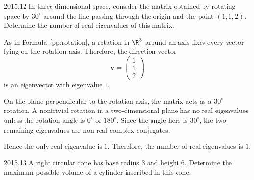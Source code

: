     \begin{pastproblem}{2015.12}
        In three-dimensional space, consider the matrix obtained by rotating space by $30^\circ$
        around the line passing through the origin and the point $(1,1,2)$. Determine the number of
        real eigenvalues of this matrix.
    \end{pastproblem}

    \begin{solution}
        As in Formula~\ref{pp:rotation}, a rotation in
        $\R^3$ around an axis fixes every vector lying on the rotation axis.
        Therefore, the direction vector
        \[
            \mathbf{v}
            =
            \begin{pmatrix}
                1 \\
                1 \\
                2
            \end{pmatrix}
        \]
        is an eigenvector with eigenvalue $1$.

        On the plane perpendicular to the rotation axis, the matrix acts as a $30^\circ$ rotation. A
        nontrivial rotation in a two-dimensional plane has no real eigenvalues unless the rotation
        angle is $0^\circ$ or $180^\circ$. Since the angle here is $30^\circ$, the two remaining
        eigenvalues are non-real complex conjugates.

        Hence the only real eigenvalue is $1$. Therefore, the number of real eigenvalues is
        $\boxed{1}$.
    \end{solution}

    \begin{pastproblem}{2015.13}
        A right circular cone has base radius $3$ and height $6$. Determine the maximum possible
        volume of a cylinder inscribed in this cone.
    \end{pastproblem}

